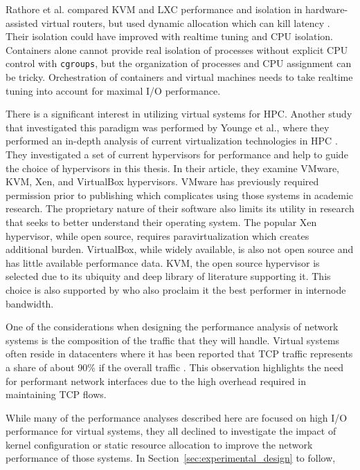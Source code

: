 Rathore et al. compared KVM and LXC performance and isolation in hardware-assisted virtual routers, but used dynamic allocation which can kill latency \autocite{rathore2013kvm}.
Their isolation could have improved with realtime tuning and CPU isolation.  
Containers alone cannot provide real isolation of processes without explicit CPU control with \texttt{cgroups}, but the organization of processes and CPU assignment can be tricky.
Orchestration of containers and virtual machines needs to take realtime tuning into account for maximal I/O performance.

There is a significant interest in utilizing virtual systems for HPC.  Another study that investigated this paradigm was performed by Younge et al., where they performed an in-depth analysis of current virtualization technologies in HPC \autocite{_younge_1}.
They investigated a set of current hypervisors for performance and help to guide the choice of hypervisors in this thesis. 
In their article, they examine VMware, KVM, Xen, and VirtualBox hypervisors. 
VMware has previously required permission prior to publishing which complicates using those systems in academic research.  
The proprietary nature of their software also limits its utility in research that seeks to better understand their operating system.  
The popular Xen hypervisor, while open source, requires paravirtualization which creates additional burden.
VirtualBox, while widely available, is also not open source and has little available performance data.  
KVM, the open source hypervisor is selected due to its ubiquity and deep library of literature supporting it.
This choice is also supported by \autocite{_younge_1} who also proclaim it the best performer in internode bandwidth.  

One of the considerations when designing the performance analysis of network systems is the composition of the traffic that they will handle.  
Virtual systems often reside in datacenters where it has been reported that TCP traffic represents a share of about 90\% if the overall traffic \autocite{haTCPCloud2013}.
This observation highlights the need for performant network interfaces due to the high overhead required in maintaining TCP flows.

While many of the performance analyses described here are focused on high I/O performance for virtual systems, they all declined to investigate the impact of kernel configuration or static resource allocation to improve the network performance of those systems.  
In Section~\ref{sec:experimental_design} to follow, 



\nocite{_dpdk_1, _adams_1, _chowdhury_1, _grinberg_1, rathore2013kvm, seo2014performance, gomes2014performance, kivity2014osv, wang2011understanding}

